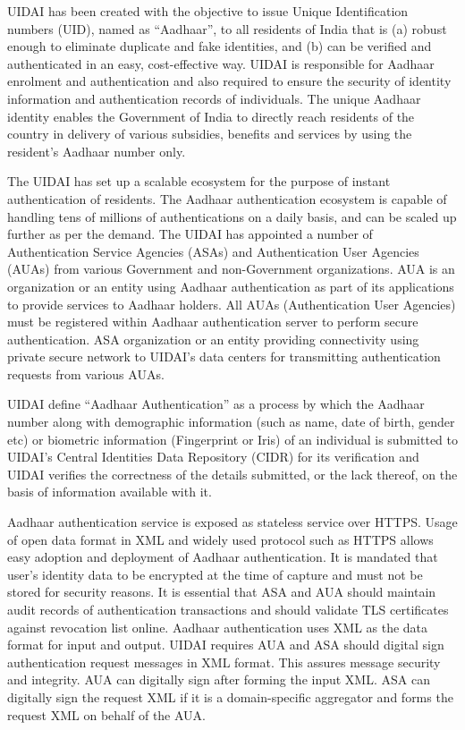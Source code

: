 \begin{multicols}{2}
UIDAI has been created with the objective to issue Unique Identification numbers (UID), named as ``Aadhaar'', to all residents of India that is (a) robust enough to eliminate duplicate and fake identities, and (b) can be verified and authenticated in an easy, cost-effective way. UIDAI is responsible for Aadhaar enrolment and authentication and also required to ensure the security of identity information and authentication records of individuals. The unique Aadhaar identity enables the Government of India to directly reach residents of the country in delivery of various subsidies, benefits and services by using the resident's Aadhaar number only.
 
The UIDAI has set up a scalable ecosystem for the purpose of instant authentication of residents. The Aadhaar authentication ecosystem is capable of handling tens of millions of authentications on a daily basis, and can be scaled up further as per the demand. The UIDAI has appointed a number of Authentication Service Agencies (ASAs) and Authentication User Agencies (AUAs) from various Government and non-Government organizations. AUA is an organization or an entity using Aadhaar authentication as part of its applications to provide services to Aadhaar holders. All AUAs (Authentication User Agencies) must be registered within Aadhaar authentication server to perform secure authentication. ASA organization or an entity providing connectivity using private secure network to UIDAI's data centers for transmitting authentication requests from various AUAs.
 
UIDAI define ``Aadhaar Authentication'' as a process by which the Aadhaar number along with demographic information (such as name, date of birth, gender etc) or biometric information (Fingerprint or Iris) of an individual is submitted to UIDAI's Central Identities Data Repository (CIDR) for its verification and UIDAI verifies the correctness of the details submitted, or the lack thereof, on the basis of information available with it.
 
Aadhaar authentication service is exposed as stateless service over HTTPS. Usage of open data format in XML and widely used protocol such as HTTPS allows easy adoption and deployment of Aadhaar authentication. It is mandated that user's identity data to be encrypted at the time of capture and must not be stored for security reasons. It is essential that ASA and AUA should maintain audit records of authentication transactions and should validate TLS certificates against revocation list online. Aadhaar authentication uses XML as the data format for input and output. UIDAI requires AUA and ASA should digital sign authentication request messages in XML format. This assures message security and integrity. AUA can digitally sign after forming the input XML. ASA can digitally sign the request XML if it is a domain-specific aggregator and forms the request XML on behalf of the AUA.
 

\end{multicols}
